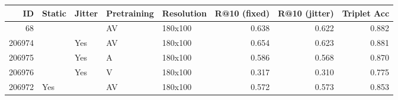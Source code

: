 \begin{tabular}{rllllrrr}
\toprule
    ID & Static & Jitter & Pretraining & Resolution &  R@10 (fixed) &  R@10 (jitter) &  Triplet Acc \\
\midrule
    68 &        &        &          AV &    180x100 &         0.638 &          0.622 &        0.882 \\
206974 &        &    Yes &          AV &    180x100 &         0.654 &          0.623 &        0.881 \\
206975 &        &    Yes &           A &    180x100 &         0.586 &          0.568 &        0.870 \\
206976 &        &    Yes &           V &    180x100 &         0.317 &          0.310 &        0.775 \\
206972 &    Yes &        &          AV &    180x100 &         0.572 &          0.573 &        0.853 \\
\bottomrule
\end{tabular}
